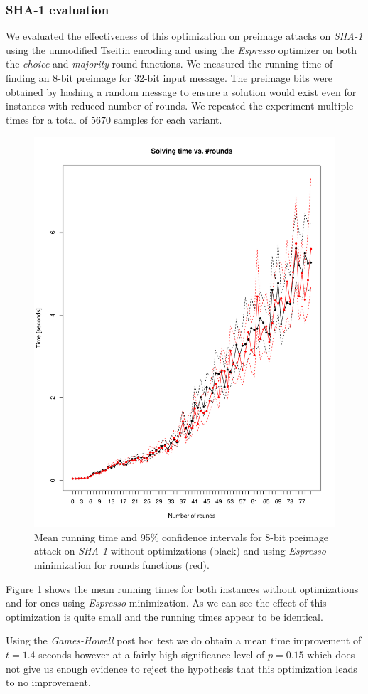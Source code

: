 \subsubsection{SHA-1 evaluation}
We evaluated the effectiveness of this optimization on preimage attacks on \emph{SHA-1} using the unmodified Tseitin encoding and using the \emph{Espresso} optimizer on both the \emph{choice} and \emph{majority} round functions.
We measured the running time of finding an $8$-bit preimage for $32$-bit input message.
The preimage bits were obtained by hashing a random message to ensure a solution would exist even for instances with reduced number of rounds.
We repeated the experiment multiple times for a total of $5670$ samples for each variant.

\begin{figure}
\centering \includegraphics[width=.5\textwidth]{figures/opt-sha1/sha1-32bit-8bitref-cmp-espresso.pdf}
\caption{Mean running time and 95\% confidence intervals for $8$-bit preimage attack on \emph{SHA-1} without optimizations (black) and using \emph{Espresso} minimization for rounds functions (red).}
\label{fig:opt-sha1-cmp-espresso}
\end{figure}
 
Figure \ref{fig:opt-sha1-cmp-espresso} shows the mean running times for both instances without optimizations and for ones using \emph{Espresso} minimization.
As we can see the effect of this optimization is quite small and the running times appear to be identical.


Using the \emph{Games-Howell} post hoc test we do obtain a mean time improvement of $t=1.4$ seconds however at a fairly high significance level of $p=0.15$ which does not give us enough evidence to reject the hypothesis that this optimization leads to no improvement.


